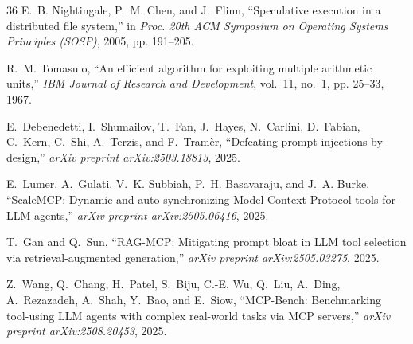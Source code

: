 \documentclass[10pt,conference]{IEEEtran}
\begin{document}
\begin{thebibliography}{36}
E.~B. Nightingale, P.~M. Chen, and J.~Flinn, ``Speculative execution in a distributed file system,'' in \emph{Proc. 20th ACM Symposium on Operating Systems Principles (SOSP)}, 2005, pp. 191--205.

R.~M. Tomasulo, ``An efficient algorithm for exploiting multiple arithmetic units,'' \emph{IBM Journal of Research and Development}, vol.~11, no.~1, pp. 25--33, 1967.

E.~Debenedetti, I.~Shumailov, T.~Fan, J.~Hayes, N.~Carlini, D.~Fabian, C.~Kern, C.~Shi, A.~Terzis, and F.~Tram{\`e}r, ``Defeating prompt injections by design,'' \emph{arXiv preprint arXiv:2503.18813}, 2025.

E.~Lumer, A.~Gulati, V.~K. Subbiah, P.~H. Basavaraju, and J.~A. Burke, ``{ScaleMCP}: Dynamic and auto-synchronizing Model Context Protocol tools for {LLM} agents,'' \emph{arXiv preprint arXiv:2505.06416}, 2025.

T.~Gan and Q.~Sun, ``{RAG-MCP}: Mitigating prompt bloat in {LLM} tool selection via retrieval-augmented generation,'' \emph{arXiv preprint arXiv:2505.03275}, 2025.

Z.~Wang, Q.~Chang, H.~Patel, S.~Biju, C.-E. Wu, Q.~Liu, A.~Ding, A.~Rezazadeh, A.~Shah, Y.~Bao, and E.~Siow, ``{MCP-Bench}: Benchmarking tool-using {LLM} agents with complex real-world tasks via {MCP} servers,'' \emph{arXiv preprint arXiv:2508.20453}, 2025.

\end{thebibliography}
\end{document}
